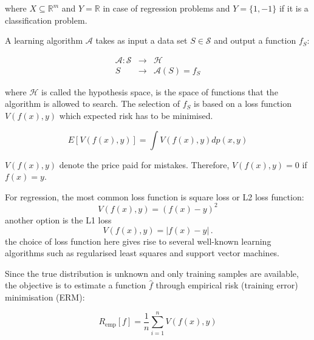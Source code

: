\noindent where $X \subseteq \mathbb{R}^m$ and $Y = \mathbb{R}$ in case of regression problems and $Y = \{1,-1\}$  if it is a classification problem. 

A learning algorithm $\mathcal{A}$ takes as input a data set $S \in \mathcal{S}$ and output a function $f_S$:

\begin{eqnarray*}
\mathcal{A}: \mathcal{S} &\rightarrow & \mathcal{H} \\
S &\rightarrow &\mathcal{A}(S) = f_S
\end{eqnarray*}

\noindent where $\mathcal{H}$ is called the hypothesis space, is the space of functions that the algorithm is allowed to search. The selection of $f_S$ is based on a loss function $V(f(x),y)$ which expected risk has to be minimised.

\[
E[V(f(x),y)] = \int V(f(x),y) dp(x,y)
\]

\noindent $V(f(x),y)$ denote the price paid for mistakes. Therefore, $V(f(x),y)=0$ if$f(x)=y$.

For regression, the most common loss function is square loss or L2 loss function:
\begin{equation}
\label{eq:l2loss}
V(f(x),y) = (f(x)-y)^2
\end{equation}
\noindent another option is the L1 loss
\begin{equation}
\label{eq:l1loss}
V(f(x),y) = |f(x)-y| \, .
\end{equation}
\noindent the choice of loss function here gives rise to several well-known learning algorithms such as regularised least squares and support vector machines. %

Since the true distribution is unknown and only training samples are available, the objective is to estimate a function $\hat{f}$ through empirical risk (training error) minimisation (ERM): 

\begin{equation} 
\label{eq:erm}
R_{\text{emp}}[f] = \frac{1}{n} \sum_{i=1}^n V(f(x),y)
\end{equation}

